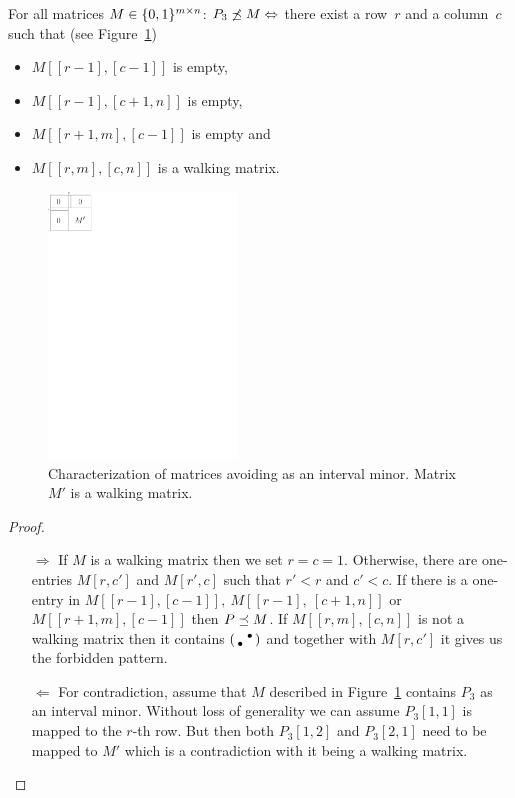 \begin{thm}
\label{thm:p31}
For all matrices $M\in\{0,1\}^{m\times n}$: $P_3\not\preceq M\Leftrightarrow$ there exist a row~$r$ and a column~$c$ such that (see Figure~\ref{fig:p12})
\begin{itemize}
\item $M[[r-1],[c-1]]$ is empty,
\item $M[[r-1],[c+1,n]]$ is empty,
\item $M[[r+1,m],[c-1]]$ is empty and
\item $M[[r,m],[c,n]]$ is a walking matrix.
\end{itemize}
\end{thm}
\begin{figure}[!ht]
\centering
\includegraphics[width=50mm]{img/p12.pdf}
\caption{Characterization of matrices avoiding \usebox{\smlmat} as an interval minor. Matrix $M'$ is a walking matrix.}
\label{fig:p12}
\end{figure}
\begin{proof}
\begin{itemize}
	\item[$\Rightarrow$] If $M$ is a walking matrix then we set $r=c=1$. Otherwise, there are one-entries $M[r,c']$ and $M[r',c]$ such that $r'<r$ and $c'<c$. If there is a one-entry in $M[[r-1],[c-1]],\ M[[r-1],\ [c+1,n]]$ or $M[[r+1,m],[c-1]]$ then $P\preceq M$. If $M[[r,m],[c,n]]$ is not a walking matrix then it contains $\left(\begin{smallmatrix} &\bullet\\\bullet& \end{smallmatrix}\right)$ and together with $M[r,c']$ it gives us the forbidden pattern.
	\item[$\Leftarrow$] For contradiction, assume that $M$ described in Figure~\ref{fig:p12} contains $P_3$ as an interval minor. Without loss of generality we can assume $P_3[1,1]$ is mapped to the $r$-th row. But then both $P_3[1,2]$ and $P_3[2,1]$ need to be mapped to $M'$ which is a contradiction with it being a walking matrix.
\end{itemize}
\end{proof}

